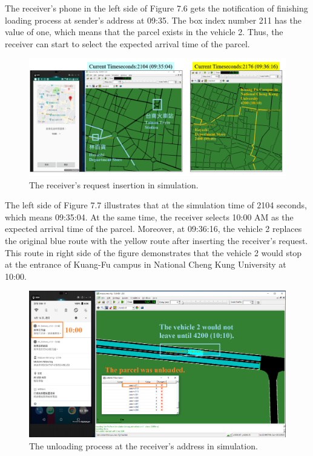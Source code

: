 \documentclass[12pt]{ksthesis}
\begin{document}
\begin{thesis}
{The receiver’s phone in the left side of Figure 7.6 gets the notification of finishing loading process at sender’s address at 09:35. The box index number 211 has the value of one, which means that the parcel exists in the vehicle 2. 
Thus, the receiver can start to select the expected arrival time of the parcel.




\begin{figure}[H]
\centering
\includegraphics[width=1.0\textwidth]{./Thesis_figures/F7-7_receiverRequest.PNG}
\caption{\large The receiver’s request insertion in simulation.}
\vspace{0.5cm}

\label{Fig:Receiver_request}
\end{figure}

The left side of Figure 7.7 illustrates that at the simulation time of 2104 seconds, which means 09:35:04. At the same time, the receiver selects 10:00 AM as the expected arrival time of the parcel. Moreover, at 09:36:16, the vehicle 2 replaces the original blue route with the yellow route after inserting the receiver’s request. This route in right side of the figure demonstrates that the vehicle 2 would stop at the entrance of Kuang-Fu campus in National Cheng Kung University at 10:00.


\begin{figure}[H]
\centering
\includegraphics[width=1.0\textwidth]{./Thesis_figures/F7-8_unloadingProcess.PNG}
\caption{\large The unloading process at the receiver’s address in simulation.}
\vspace{0.5cm}
\label{Fig:unloading_request}
\end{figure}


}
\end{thesis}
\end{document}

